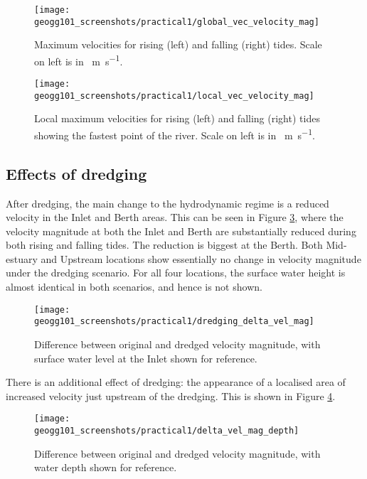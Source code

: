 \documentclass{article}
\begin{document}
\begin{figure}[!h]
    \centering
    \texttt{[image: geogg101\_screenshots/practical1/global\_vec\_velocity\_mag]}
    \caption{Maximum velocities for rising (left) and falling (right) tides. Scale on left is in \SI{}{m.s^{-1}}.}
    \label{fig:global_velocities}
\end{figure}

\begin{figure}[!h]
    \centering
    \texttt{[image: geogg101\_screenshots/practical1/local\_vec\_velocity\_mag]}
    \caption{Local maximum velocities for rising (left) and falling (right) tides showing the fastest point of the river. Scale on left is in \SI{}{m.s^{-1}}.}
    \label{fig:local_velocities}
\end{figure}

\subsection{Effects of dredging}

After dredging, the main change to the hydrodynamic regime is a reduced velocity in the Inlet and Berth areas. This can be seen in Figure \ref{fig:dredging_delta_vel_mag}, where the velocity magnitude at both the Inlet and Berth are substantially reduced during both rising and falling tides. The reduction is biggest at the Berth. Both Mid-estuary and Upstream locations show essentially no change in velocity magnitude under the dredging scenario. For all four locations, the surface water height is almost identical in both scenarios, and hence is not shown.

\begin{figure}[!h]
    \centering
    \texttt{[image: geogg101\_screenshots/practical1/dredging\_delta\_vel\_mag]}
    \caption{Difference between original and dredged velocity magnitude, with surface water level at the Inlet shown for reference.}
    \label{fig:dredging_delta_vel_mag}
\end{figure}

There is an additional effect of dredging: the appearance of a localised area of increased velocity just upstream of the dredging. This is shown in Figure \ref{fig:delta_vel_mag_depth}. 

\begin{figure}[!h]
    \centering
    \texttt{[image: geogg101\_screenshots/practical1/delta\_vel\_mag\_depth]}
    \caption{Difference between original and dredged velocity magnitude, with water depth shown for reference.}
    \label{fig:delta_vel_mag_depth}
\end{figure}
\end{document}
